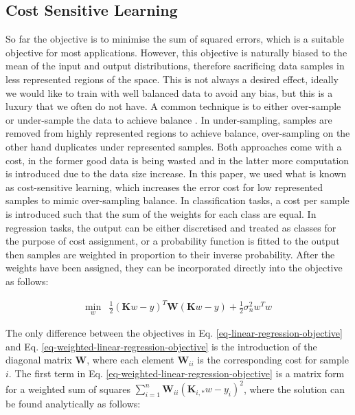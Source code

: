 \documentclass[useAMS,usenatbib,fleqn]{mn2e}
\newcommand{\bm}[1]{\mathbf{#1} }
\begin{document}
\subsection{Cost Sensitive Learning}

So far the objective is to minimise the sum of squared errors, which is a suitable objective for most applications. However, this objective is naturally biased to the mean of the input and output distributions, therefore sacrificing data samples in less represented regions of the space. This is not always a desired effect, ideally we would like to train with well balanced data to avoid any bias, but this is a luxury that we often do not have. A common technique is to either over-sample or under-sample the data to achieve balance \citep{weiss2007}. In under-sampling, samples are removed from highly represented regions to achieve balance, over-sampling on the other hand duplicates under represented samples. Both approaches come with a cost, in the former good data is being wasted and in the latter more computation is introduced due to the data size increase. In this paper, we used what is known as cost-sensitive learning, which increases the error cost for low represented samples to mimic over-sampling balance. In classification tasks, a cost per sample is introduced such that the sum of the weights for each class are equal. In regression tasks, the output can be either discretised and treated as classes for the purpose of cost assignment, or a probability function is fitted to the output then samples are weighted in proportion to their inverse probability. After the weights have been assigned, they can be incorporated directly into the objective as follows:

\begin{equation}
\label{eq-weighted-linear-regression-objective}
\begin{array}{lcl}
\underset{w}{\text{min}} &\frac{1}{2}\left ( \bm{K}w-y \right )^{T} \bm{W}\left( \bm{K}w-y \right )+\frac{1}{2}\sigma_{n}^{2}w^{T}w
\end{array}
\end{equation}

The only difference between the objectives in Eq. \eqref{eq-linear-regression-objective} and Eq. \eqref{eq-weighted-linear-regression-objective} is the introduction of the diagonal matrix $\bm{W}$, where each element $\bm{W}_{ii}$ is the corresponding cost for sample $i$. The first term in Eq. \eqref{eq-weighted-linear-regression-objective} is a matrix form for a weighted sum of squares $\sum_{i=1}^{n}\bm{W}_{ii}\left(\bm{K}_{i,*}w-y_{i}\right)^{2}$, where the solution can be found analytically as follows:
\end{document}
